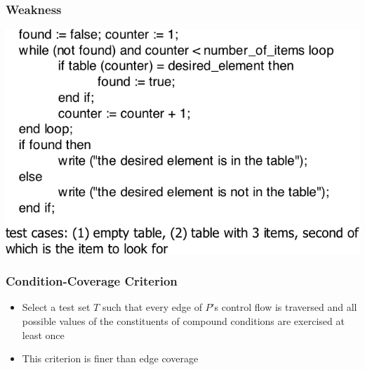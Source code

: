 \documentclass[t,12pt,numbers,fleqn]{beamer}
\begin{document}
\begin{frame}
\frametitle{Weakness}

\includegraphics[scale=0.4]{../Figures/WeaknessEdgeCoverage.png}\\

\end{frame}


\begin{frame}

\lstset{language=java,breaklines=true,showspaces=false,showstringspaces=false,breakatwhitespace=true}
\noindent 

\end{frame}


\begin{frame}
\frametitle{Condition-Coverage Criterion}

\begin{itemize}
\item Select a test set $T$ such that every edge of $P$'s control flow is traversed and all possible values of the
constituents of compound conditions are exercised at least once
\item This criterion is finer than edge coverage
\end{itemize}

\end{frame}

\end{document}
